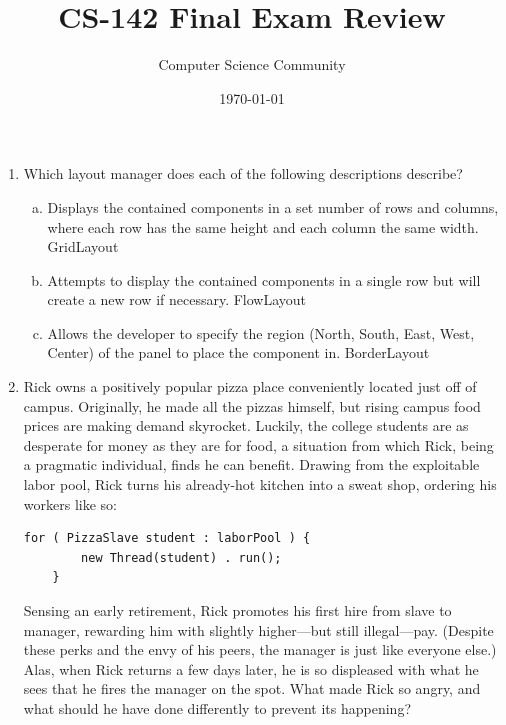\documentclass[11pt]{article}
\author{Computer Science Community}
\title{CS-142 Final Exam Review}
\date{\today}
\newenvironment{answer}{\large\lstset{basicstyle=\tiny\ttfamily}\color{white}}{}
\newenvironment{answer}{\large\lstset{basicstyle=\large\ttfamily}\color{red}}{}
\begin{document}
\header

\begin{enumerate}
\item Which layout manager does each of the following descriptions describe?
\begin{enumerate}[(a)]

\item Displays the contained components in a set number of rows and columns,
      where each row has the same height and each column the same width.
\begin{answer}
GridLayout
\end{answer}

\vspace{6pt}
\item Attempts to display the contained components in a single row but will
      create a new row if necessary.
\begin{answer}
FlowLayout
\end{answer}

\vspace{6pt}
\item Allows the developer to specify the region (North, South, East, West,
      Center) of the panel to place the component in.
\begin{answer}
BorderLayout
\end{answer}

\end{enumerate}

\item Rick owns a positively popular pizza place conveniently located just off of campus.
	Originally, he made all the pizzas himself, but rising campus food prices are making demand skyrocket.
	Luckily, the college students are as desperate for money as they are for food, a situation from which Rick, being a pragmatic individual, finds he can benefit.
	Drawing from the exploitable labor pool, Rick turns his already-hot kitchen into a sweat shop, ordering his workers like so:
	\begin{lstlisting}[numbers=none]
	for ( PizzaSlave student : laborPool ) {
		new Thread(student) . run();
	}
	\end{lstlisting}
	Sensing an early retirement, Rick promotes his first hire from slave to manager, rewarding him with slightly higher---but still illegal---pay.
	(Despite these perks and the envy of his peers, the manager is just like everyone else.)
	Alas, when Rick returns a few days later, he is so displeased with what he sees that he fires the manager on the spot.
	What made Rick so angry, and what should he have done differently to prevent its happening?


\end{enumerate}
\end{document}

